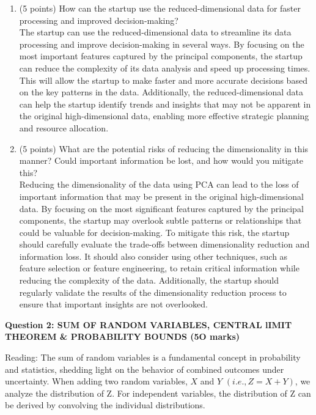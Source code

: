 \documentclass[a3paper,12pt]{extarticle} %
\begin{document}
\begin{enumerate}
\begin{enumerate}
    \item (5 points) How can the startup use the reduced-dimensional data for faster processing and improved decision-making?
    \\ The startup can use the reduced-dimensional data to streamline its data processing and improve decision-making in several ways. By focusing on the most important features captured by the principal components, the startup can reduce the complexity of its data analysis and speed up processing times. This will allow the startup to make faster and more accurate decisions based on the key patterns in the data. Additionally, the reduced-dimensional data can help the startup identify trends and insights that may not be apparent in the original high-dimensional data, enabling more effective strategic planning and resource allocation.
    \item (5 points) What are the potential risks of reducing the dimensionality in this manner? Could important information be lost, and how would you mitigate this?
    \\ Reducing the dimensionality of the data using PCA can lead to the loss of important information that may be present in the original high-dimensional data. By focusing on the most significant features captured by the principal components, the startup may overlook subtle patterns or relationships that could be valuable for decision-making. To mitigate this risk, the startup should carefully evaluate the trade-offs between dimensionality reduction and information loss. It should also consider using other techniques, such as feature selection or feature engineering, to retain critical information while reducing the complexity of the data. Additionally, the startup should regularly validate the results of the dimensionality reduction process to ensure that important insights are not overlooked.
    \end{enumerate}
\end{enumerate}
\newpage
\begin{center}
    \large \textbf{Question 2: SUM OF RANDOM VARIABLES, CENTRAL lIMIT THEOREM \& PROBABILITY BOUNDS (5O marks)}
\end{center}
    Reading: The sum of random variables is a fundamental concept in probability and statistics, shedding
    light on the behavior of combined outcomes under uncertainty. When adding two random variables, \(X\)
    and \(Y\) \((i.e., Z = X + Y )\), we analyze the distribution of Z. For independent variables, the distribution
    of Z can be derived by convolving the individual distributions.
\end{document}
